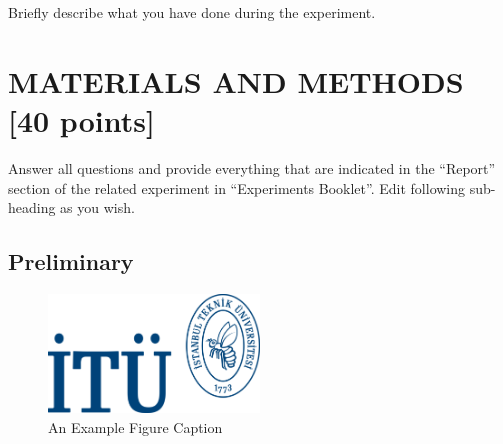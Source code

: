 \documentclass[pdftex,12pt,a4paper]{article}
\begin{document}
Briefly describe what you have done during the experiment.

\section{MATERIALS AND METHODS [40 points]}
Answer all questions and provide everything that are indicated in the “Report” section of the related experiment in “Experiments Booklet”.
Edit following sub-heading as you wish.

\subsection{Preliminary}
\begin{figure}[H]
	\centering
	\includegraphics[width=0.5\textwidth]{logo.png}	
	\caption{An Example Figure Caption\cite{ref1}}
	\label{fig1}
\end{figure}
\end{document}
